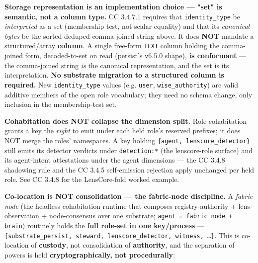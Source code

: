 \documentclass[11pt]{article}
\begin{document}
\textbf{Storage representation is an implementation choice — "set" is semantic, not a column type.} CC 3.4.7.1 requires that \texttt{identity\_type} be \textit{interpreted} as a set (membership test, not scalar equality) and that its \textit{canonical bytes} be the sorted-deduped-comma-joined string above. It does \textbf{NOT} mandate a structured/array \textbf{column}. A single free-form \texttt{TEXT} column holding the comma-joined form, decoded-to-set on read (persist's v6.5.0 shape), \textbf{is conformant} — the comma-joined string \textit{is} the canonical representation, and the set is its interpretation. \textbf{No substrate migration to a structured column is required.} New \texttt{identity\_type} values (e.g. \texttt{user}, \texttt{wise\_authority}) are valid additive members of the open role vocabulary; they need no schema change, only inclusion in the membership-test set.


\textbf{Cohabitation does NOT collapse the dimension split.} Role cohabitation grants a key the \textit{right} to emit under each held role's reserved prefixes; it does NOT merge the roles' namespaces. A key holding \texttt{\{agent, lenscore\_detector\}} still emits its detector verdicts under \texttt{detection:*} (the lenscore-role surface) and its agent-intent attestations under the agent dimensions — the CC 3.4.8 shadowing rule and the CC 3.4.5 self-emission rejection apply unchanged per held role. See CC 3.4.8 for the LensCore-fold worked example.


\textbf{Co-location is NOT consolidation — the fabric-node discipline.} A \textit{fabric node} (the headless cohabitation runtime that composes registry-authority + lens-observation + node-consensus over one substrate; \texttt{agent = fabric node + brain}) routinely holds the \textbf{full role-set in one key/process} — \texttt{\{substrate\_persist, steward, lenscore\_detector, witness, …\}}. This is co-location of \textbf{custody}, not consolidation of \textbf{authority}, and the separation of powers is held \textbf{cryptographically, not procedurally}:
\end{document}
